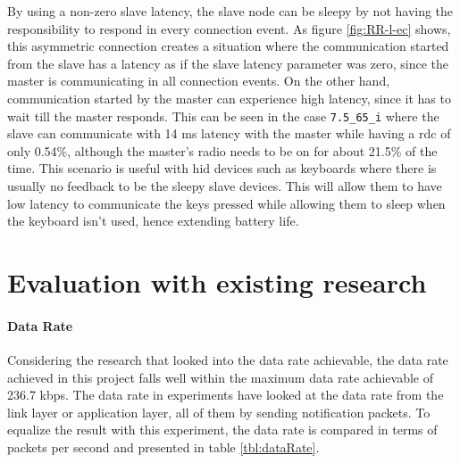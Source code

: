 By using a non-zero slave latency, the slave node can be sleepy by not having the responsibility to respond in every connection event. As figure \ref{fig:RR-l-ec} shows, this asymmetric connection creates a situation where the communication started from the slave has a latency as if the slave latency parameter was zero, since the master is communicating in all connection events. On the other hand, communication started by the master can experience high latency, since it has to wait till the master responds. This can be seen in the case \texttt{7.5\_65\_i} where the slave can communicate with 14 ms latency with the master while having a \gls{rdc} of only 0.54\%, although the master's radio needs to be on for about 21.5\% of the time. This scenario is useful with \gls{hid} devices such as keyboards where there is usually no feedback to be the sleepy slave devices. This will allow them to have low latency to communicate the keys pressed while allowing them to sleep when the keyboard isn't used, hence extending battery life.

\section{Evaluation with existing research} \label{7Eval}
\paragraph{Data Rate}
Considering the research that looked into the data rate achievable, the data rate achieved in this project falls well within the maximum data rate achievable\cite{Gomez2011} of 236.7 kbps. The data rate in experiments have looked at the data rate from the link layer\cite{Mikhaylov2013} or application layer\cite{Gomez2012}\cite{Mackensen2012}\cite{Kindt2014}, all of them by sending notification packets. To equalize the result with this experiment, the data rate is compared in terms of packets per second and presented in table \ref{tbl:dataRate}.

